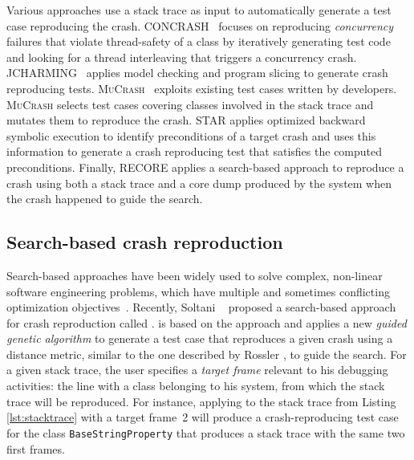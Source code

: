 Various approaches use a stack trace as input to automatically generate a test case reproducing the crash.
%
\textsc{CONCRASH}~\cite{BPT17concrash} focuses on reproducing \textit{concurrency} failures that violate thread-safety of a class by iteratively generating test code and looking for a thread interleaving that triggers a concurrency crash. %
%
\textsc{JCHARMING}~\cite{nayrolles2015jcharming,Nayrolles2017} applies model checking and program slicing to generate crash reproducing tests. %
%
\textsc{MuCrash}~\cite{Xuan2015} exploits existing test cases written by developers. \textsc{MuCrash} selects test cases covering classes involved in the stack trace and mutates them to reproduce the crash.
%
\textsc{STAR} \cite{Chen2015} applies optimized backward symbolic execution to identify preconditions of a target crash and uses this information to generate a crash reproducing test that satisfies the computed preconditions.
%
Finally, \textrm{RECORE} \cite{Rossler2013} applies a search-based approach to reproduce a crash using  both a stack trace and a core dump produced by the system when the crash happened to guide the search.


\subsection{Search-based crash reproduction}

Search-based approaches have been widely used to solve complex, non-linear software engineering problems, which  have multiple and sometimes conflicting optimization objectives~\cite{Harman2012}. Recently, Soltani \etal~\cite{soltani2017} proposed a search-based approach for crash reproduction called \evocrash. \evocrash is based on the \evosuite approach \cite{fraser2012whole,Fraser2014b} and applies a new \textit{guided genetic algorithm} to generate a test case that reproduces a given crash using a distance metric, similar to the one described by Rossler \etal \cite{Rossler2013}, to guide the search.
%
For a given stack trace, the user specifies a \emph{target frame} relevant to his debugging activities: \ie the line with a class belonging to his system, from which the stack trace will be reproduced. For instance, applying \evocrash to the stack trace from Listing \ref{lst:stacktrace} with a target frame~2 will produce a crash-reproducing test case for the class \texttt{BaseStringProperty} that produces a stack trace with the same two first frames. 

